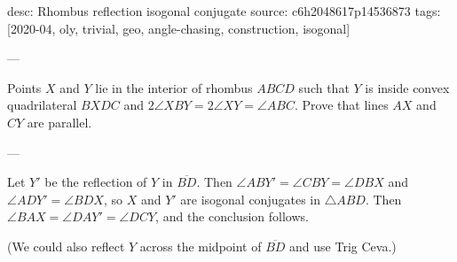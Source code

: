 desc: Rhombus reflection isogonal conjugate
source: c6h2048617p14536873
tags: [2020-04, oly, trivial, geo, angle-chasing, construction, isogonal]

---

Points $X$ and $Y$ lie in the interior of rhombus $ABCD$ such that $Y$ is inside convex quadrilateral $BXDC$ and $2\angle XBY=2\angle XY=\angle ABC$. Prove that lines $AX$ and $CY$ are parallel.

---

Let $Y'$ be the reflection of $Y$ in $\overline{BD}$. Then $\angle ABY'=\angle CBY=\angle DBX$ and $\angle ADY'=\angle BDX$, so $X$ and $Y'$ are isogonal conjugates in $\triangle ABD$. Then $\angle BAX=\angle DAY'=\angle DCY$, and the conclusion follows.

(We could also reflect $Y$ across the midpoint of $\overline{BD}$ and use Trig Ceva.)
